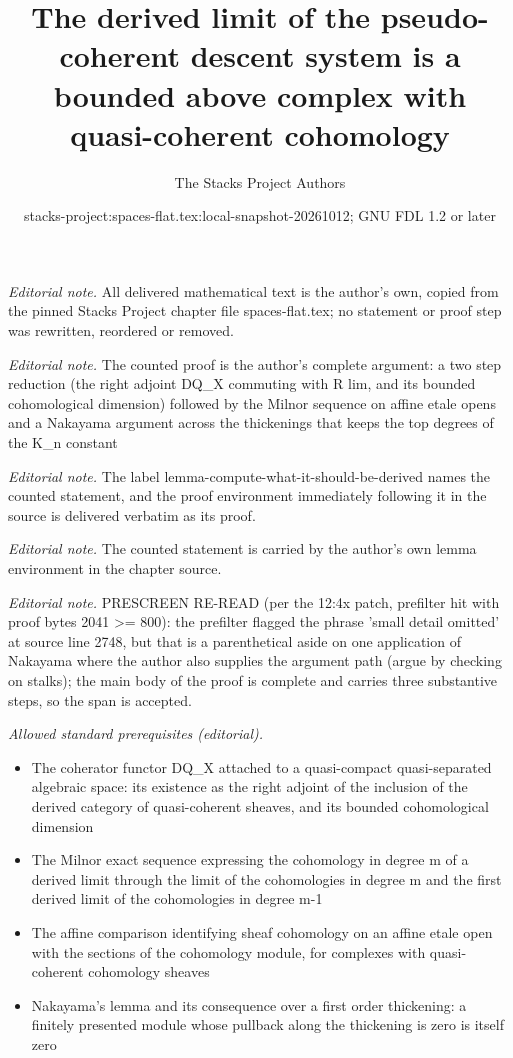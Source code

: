 \documentclass[10pt,a4paper]{amsart}
\title{The derived limit of the pseudo-coherent descent system is a bounded above complex with quasi-coherent cohomology}
\author{The Stacks Project Authors}
\date{stacks-project:spaces-flat.tex:local-snapshot-20261012; GNU FDL 1.2 or later}
\theoremstyle{plain}
\theoremstyle{definition}
\theoremstyle{remark}
\numberwithin{equation}{subsection}
\begin{document}
\maketitle
\noindent\textit{Editorial note.} All delivered mathematical text is the author's own, copied from the pinned Stacks Project chapter file spaces-flat.tex; no statement or proof step was rewritten, reordered or removed.\par\medskip
\noindent\textit{Editorial note.} The counted proof is the author's complete argument: a two step reduction (the right adjoint DQ\_X commuting with R lim, and its bounded cohomological dimension) followed by the Milnor sequence on affine etale opens and a Nakayama argument across the thickenings that keeps the top degrees of the K\_n constant\par\medskip
\noindent\textit{Editorial note.} The label lemma-compute-what-it-should-be-derived names the counted statement, and the proof environment immediately following it in the source is delivered verbatim as its proof.\par\medskip
\noindent\textit{Editorial note.} The counted statement is carried by the author's own lemma environment in the chapter source.\par\medskip
\noindent\textit{Editorial note.} PRESCREEN RE-READ (per the 12:4x patch, prefilter hit with proof bytes 2041 >= 800): the prefilter flagged the phrase 'small detail omitted' at source line 2748, but that is a parenthetical aside on one application of Nakayama where the author also supplies the argument path (argue by checking on stalks); the main body of the proof is complete and carries three substantive steps, so the span is accepted.\par\medskip
\noindent\textit{Allowed standard prerequisites (editorial).}\begin{itemize}
\item The coherator functor DQ\_X attached to a quasi-compact quasi-separated algebraic space: its existence as the right adjoint of the inclusion of the derived category of quasi-coherent sheaves, and its bounded cohomological dimension
\item The Milnor exact sequence expressing the cohomology in degree m of a derived limit through the limit of the cohomologies in degree m and the first derived limit of the cohomologies in degree m-1
\item The affine comparison identifying sheaf cohomology on an affine etale open with the sections of the cohomology module, for complexes with quasi-coherent cohomology sheaves
\item Nakayama's lemma and its consequence over a first order thickening: a finitely presented module whose pullback along the thickening is zero is itself zero
\end{itemize}\medskip
\end{document}
